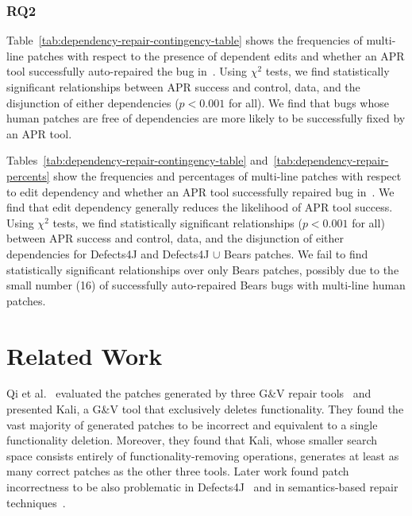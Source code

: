 \documentclass[sigconf, timestamp-false, anonymous=true]{acmart}
\begin{document}
\subsubsection{RQ2} 

Table~\ref{tab:dependency-repair-contingency-table} shows
the frequencies of multi-line patches with respect to the presence of 
dependent edits and whether an APR tool successfully auto-repaired the bug in~\cite{durieux-repair-them-all}.
Using $\chi^2$ tests, we find statistically significant relationships between APR  
success and control, data, and the disjunction of either dependencies 
($p < 0.001$ for all).
We find that bugs whose human patches are free of dependencies are
more likely to be successfully fixed by an APR tool.

Tables~\ref{tab:dependency-repair-contingency-table} and~\ref{tab:dependency-repair-percents}
show the frequencies and percentages of multi-line patches with respect to edit dependency 
and whether an APR tool successfully repaired bug in~\cite{durieux-repair-them-all}.
We find that edit dependency generally reduces the likelihood of APR tool success.
Using $\chi^2$ tests, we find statistically significant relationships ($p < 0.001$ for all)
between APR success and control, data, and the disjunction of either dependencies 
for Defects4J and Defects4J $\cup$ Bears patches. We fail to find statistically 
significant relationships over only Bears patches, possibly due to the small number (16) of 
successfully auto-repaired Bears bugs with multi-line human patches.





\section{Related Work}

Qi et al.~\cite{patch-correctness} evaluated the patches generated 
by three G\&V repair tools~\cite{genprog, ae, rsrepair} and presented 
Kali, a G\&V tool that exclusively deletes functionality. They found the 
vast majority of generated patches to be incorrect and equivalent to 
a single functionality deletion. Moreover, they found that Kali, whose 
smaller search space consists entirely of functionality-removing 
operations, generates at least as many correct patches as the 
other three tools. Later work found patch incorrectness to be 
also problematic in Defects4J~\cite{d4j-eval} and in semantics-based 
repair techniques~\cite{Le2018}.
\end{document}
